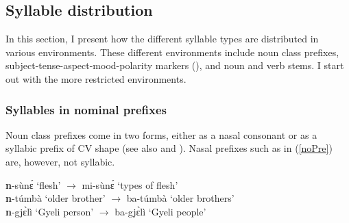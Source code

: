 



\subsection{Syllable distribution}
\label{sec:SyllDist}

In this section, I present how the different syllable types are distributed in various environments. These different environments include noun class prefixes, subject-tense-aspect-mood-polarity markers (), and noun and verb stems. I start out with the more restricted environments.

\subsubsection{Syllables in nominal prefixes}
\label{sec:SyllPre}

Noun class prefixes come in two forms, either as a nasal consonant or as a syllabic prefix of CV shape (see also  and ). Nasal prefixes such as in (\ref{noPre}) are, however, not syllabic. 

\begin{exe} \ex \label{noPre}
{\bfseries n}-sùnɛ́ `flesh' $\rightarrow$ mi-sùnɛ́ `types of flesh' \\
{\bfseries n}-túmbà `older brother' $\rightarrow$ ba-túmbà `older brothers' \\
{\bfseries n}-gjɛ̀lì `Gyeli person' $\rightarrow$ ba-gjɛ̀lì `Gyeli people'
\end{exe}



